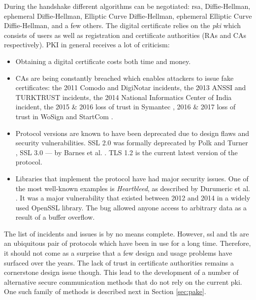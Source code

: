 During the handshake different algorithms can be negotiated: \gls{rsa}, Diffie-Hellman, ephemeral Diffie-Hellman, Elliptic Curve Diffie-Hellman, ephemeral Elliptic Curve Diffie-Hellman, and a few others. The digital certificate relies on the \emph{\gls{pki}} which consists of users as well as registration and certificate authorities (RAs and CAs respectively). PKI in general receives a lot of criticism:

\begin{itemize}
    \item Obtaining a digital certificate costs both time and money.
    \item CAs are being constantly breached which enables attackers to issue fake certificates: the 2011 Comodo \cite{comodo:2017:ca-incident} and DigiNotar \cite{diginotar:2017:ca-incident} incidents, the 2013 ANSSI \cite{anssi:2017:ca-incident} and TURKTRUST \cite{turktrust:2017:ca-incident-0} incidents, the 2014 National Informatics Center of India \cite{nic:2017:ca-incident} incident, the 2015 \& 2016 loss of trust in Symantec \cite{symantec:2017:ca-incident-0, symantec:2017:ca-incident-1}, 2016 \& 2017 loss of trust in WoSign and StartCom \cite{startcom:2017:ca-incident-0, startcom:2017:ca-incident-1}.
    \item Protocol versions are known to have been deprecated due to design flaws and security vulnerabilities. SSL 2.0 was formally deprecated by Polk and Turner \cite{rfc6176}, SSL 3.0  --- by Barnes et al. \cite{rfc7568}. TLS 1.2 is the current latest version of the protocol.
    \item Libraries that implement the protocol have had major security issues. One of the most well-known examples is \emph{Heartbleed}, as described by Durumeric et al. \cite{durumeric2014matter}. It was a major vulnerability that existed between 2012 and 2014 in a widely used OpenSSL library. The bug allowed anyone access to arbitrary data as a result of a buffer overflow.
  \end{itemize}

The list of incidents and issues is by no means complete. However, \gls{ssl} and \gls{tls} are an ubiquitous pair of protocols which have been in use for a long time. Therefore, it should not come as a surprise that a few design and usage problems have surfaced over the years. The lack of trust in certificate authorities remains a cornerstone design issue though. This lead to the development of a number of alternative secure communication methods that do not rely on the current \gls{pki}. One such family of methods is described next in Section \ref{sec:pake}.

